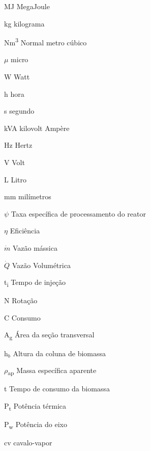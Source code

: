 \begin{simbolos}
	\item[MJ] MegaJoule
	\item[kg] kilograma
	\item[Nm\textsuperscript{3}] Normal metro cúbico
 	\item[$\mu$] micro
	\item[W] Watt
	\item[h] hora
	\item[s] segundo
	\item[kVA] kilovolt Ampère
	\item[Hz] Hertz
	\item[V] Volt
	\item[L] Litro
	\item[mm] milímetros
	\item[$\psi$] Taxa específica de processamento do reator
	\item[$\eta$] Eficiência
	\item[$\dot{m}$] Vazão mássica
	\item[$\dot{Q}$] Vazão Volumétrica
	\item[t\textsubscript{i}] Tempo de injeção
	\item[N] Rotação
	\item[C] Consumo
	\item[A\textsubscript{g}] Área da seção transversal
	\item[h$_b$] Altura da coluna de biomassa
	\item[$\rho$\textsubscript{ap}]	Massa específica aparente
	\item[t] Tempo de consumo da biomassa
	\item[P\textsubscript{t}] Potência térmica
	\item[P\textsubscript{w}] Potência do eixo
	\item[cv] cavalo-vapor


\end{simbolos}
